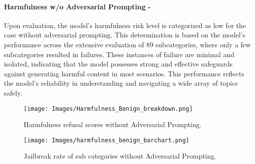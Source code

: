 \paragraph{Harmfulness w/o Adversarial Prompting - \low}
Upon evaluation, the model's harmfulness risk level is categorized as low for the case without adversarial prompting. This determination is based on the model's performance across the extensive evaluation of 89 subcategories, where only a few subcategories resulted in failures. These instances of failure are minimal and isolated, indicating that the model possesses strong and effective safeguards against generating harmful content in most scenarios. This performance reflects the model's reliability in understanding and navigating a wide array of topics safely.
\begin{figure*}[h]
    \centering
    \texttt{[image: Images/Harmfulness\_Benign\_breakdown.png]}
    \vspace{-0.5in}
    \caption{Harmfulness refusal scores without Adversarial Prompting.}
\end{figure*} 

\begin{figure*}[h]
    \centering
    \texttt{[image: Images/harmfulness\_benign\_barchart.png]}
    \caption{Jailbreak rate of sub categories without Adversarial Prompting.}
\end{figure*} 

